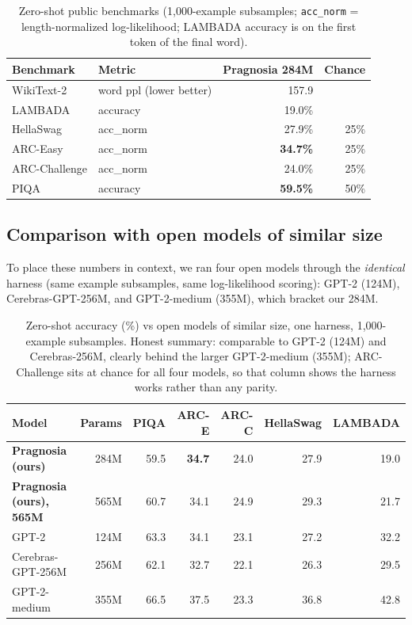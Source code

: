 \documentclass[11pt]{article}
\newcommand{\code}[1]{\texttt{#1}}
\begin{document}
\begin{table}[h]\centering\small
\caption{Zero-shot public benchmarks (1{,}000-example subsamples; \code{acc\_norm} = length-normalized log-likelihood; LAMBADA accuracy is on the first token of the final word).}
\begin{tabular}{@{}l l r r@{}}
\toprule
Benchmark & Metric & Pragnosia 284M & Chance \\
\midrule
WikiText-2 & word ppl (lower better) & 157.9 & \\
LAMBADA & accuracy & 19.0\% & \\
HellaSwag & acc\_norm & 27.9\% & 25\% \\
ARC-Easy & acc\_norm & \textbf{34.7\%} & 25\% \\
ARC-Challenge & acc\_norm & 24.0\% & 25\% \\
PIQA & accuracy & \textbf{59.5\%} & 50\% \\
\bottomrule
\end{tabular}
\end{table}

\subsection{Comparison with open models of similar size}
To place these numbers in context, we ran four open models through the \emph{identical} harness (same example subsamples, same log-likelihood scoring): GPT-2 (124M), Cerebras-GPT-256M, and GPT-2-medium (355M), which bracket our 284M.

\begin{table}[h]\centering\small
\caption{Zero-shot accuracy (\%) vs open models of similar size, one harness, 1{,}000-example subsamples. Honest summary: comparable to GPT-2 (124M) and Cerebras-256M, clearly behind the larger GPT-2-medium (355M); ARC-Challenge sits at chance for all four models, so that column shows the harness works rather than any parity.}
\begin{tabular}{@{}l r r r r r r@{}}
\toprule
Model & Params & PIQA & ARC-E & ARC-C & HellaSwag & LAMBADA \\
\midrule
\textbf{Pragnosia (ours)} & 284M & 59.5 & \textbf{34.7} & 24.0 & 27.9 & 19.0 \\
\textbf{Pragnosia (ours), 565M} & 565M & 60.7 & 34.1 & 24.9 & 29.3 & 21.7 \\
GPT-2 & 124M & 63.3 & 34.1 & 23.1 & 27.2 & 32.2 \\
Cerebras-GPT-256M & 256M & 62.1 & 32.7 & 22.1 & 26.3 & 29.5 \\
GPT-2-medium & 355M & 66.5 & 37.5 & 23.3 & 36.8 & 42.8 \\
\bottomrule
\end{tabular}
\end{table}
\end{document}
